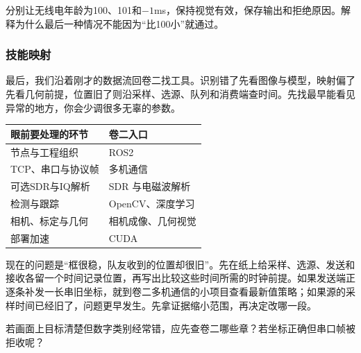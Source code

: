 \begin{exercise}
\label{v3-ex-radar-6}
分别让无线电年龄为100、101和$-1$ms，保持视觉有效，保存输出和拒绝原因。解释为什么最后一种情况不能因为“比100小”就通过。
\end{exercise}

\subsubsection{技能映射}

最后，我们沿着刚才的数据流回卷二找工具。识别错了先看图像与模型，映射偏了先看几何前提，位置旧了则沿采样、选源、队列和消费端查时间。先找最早能看见异常的地方，你会少调很多无辜的参数。

\begin{center}
\begin{tabular}{@{}p{}p{}@{}}
\toprule[1.5pt]
眼前要处理的环节 & 卷二入口 \\
\midrule[1pt]
节点与工程组织 & ROS2 \\
TCP、串口与协议帧 & 多机通信 \\
可选SDR与IQ解析 & SDR 与电磁波解析 \\
检测与跟踪 & OpenCV、深度学习 \\
相机、标定与几何 & 相机成像、几何视觉 \\
部署加速 & CUDA \\
\bottomrule[1.5pt]
\end{tabular}
\end{center}

\begin{example}[沿故障查专项]
现在的问题是“框很稳，队友收到的位置却很旧”。先在纸上给采样、选源、发送和接收各留一个时间记录位置，再写出比较这些时间所需的时钟前提。如果发送端正逐条补发一长串旧坐标，就到卷二多机通信的小项目查看最新值策略；如果源的采样时间已经旧了，问题更早发生。先拿证据缩小范围，再决定改哪一段。
\end{example}

\begin{exercise}
\label{v3-ex-radar-5}
若画面上目标清楚但数字类别经常错，应先查卷二哪些章？若坐标正确但串口帧被拒收呢？
\end{exercise}
